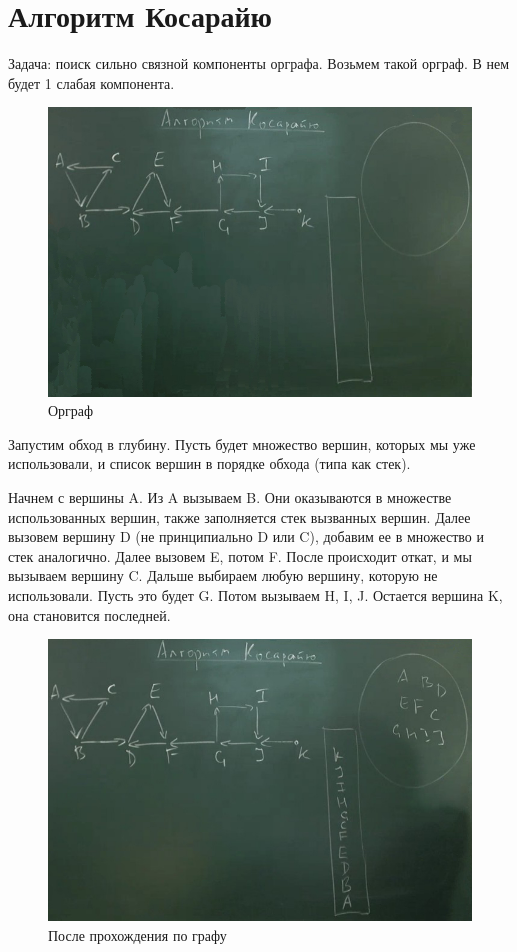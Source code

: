 \documentclass[a4paper,12pt]{article}
\theoremstyle{plain} %
\theoremstyle{definition} %
\theoremstyle{remark} %
\begin{document}
\section{Алгоритм Косарайю}
Задача: поиск сильно связной компоненты орграфа. Возьмем такой орграф. В нем будет 1 слабая компонента.
\vspace{1.2cm}
\begin{figure}[h!]
	\centering
	\includegraphics[width=0.8\linewidth]{kos1}
	\caption{Орграф}
\end{figure}

Запустим обход в глубину. Пусть будет множество вершин, которых мы уже использовали, и список вершин в порядке обхода (типа как стек).

Начнем с вершины A. Из A вызываем B. Они оказываются в множестве использованных вершин, также заполняется стек вызванных вершин. Далее вызовем вершину D (не принципиально D или C), добавим ее в множество и стек аналогично. Далее вызовем E, потом F. После происходит откат, и мы вызываем вершину C. Дальше выбираем любую вершину, которую не использовали. Пусть это будет G. Потом вызываем H, I, J. Остается вершина K, она становится последней.
\vspace{10cm}
\begin{figure}[h!]
	\centering
	\includegraphics[width=0.8\linewidth]{kos2}
	\caption{После прохождения по графу}
\end{figure}
\end{document}
